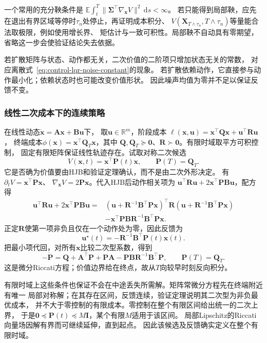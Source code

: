 一个常用的充分鞅条件是
$\mathbb E\int_t^T\lVert\bm\Sigma^\top\nabla_{\bm x}V\rVert^2\,\mathrm ds<\infty$。
若只能得到局部鞅，应先在退出有界区域等停时$\tau_n$处停止，再证明成本积分、
$V(\bm X_{T\wedge\tau_n},T\wedge\tau_n)$等量能合法取极限，例如使用增长界、
矩估计与一致可积性。局部鞅不自动具有零期望，省略这一步会使验证结论失去依据。

若扩散矩阵与状态、动作都无关，二次价值的二阶项只增加状态无关的常数，
对应离散式~\eqref{eq:control-lqr-noise-constant}的现象。
若扩散依赖动作，它直接参与动作最小化；依赖状态时也可能改变价值形状。
因此噪声均值为零并不足以保证反馈不变。

\subsubsection{线性二次成本下的连续策略}

在线性动态$\dot{\bm x}=\bm A\bm x+\bm B\bm u$下，
取$\bm u\in\mathbb R^m$，阶段成本
$\ell(\bm x,\bm u)=\bm x^\top\bm Q\bm x+\bm u^\top\bm R\bm u$，
终端成本$\phi(\bm x)=\bm x^\top\bm Q_T\bm x$，其中
$\bm Q,\bm Q_T\succeq\bm0$、$\bm R\succ\bm0$。有限时域取平方可积控制，
固定有限矩阵保证线性轨迹存在。试取对称二次候选
\[
  V(\bm x,t)=\bm x^\top\bm P(t)\bm x,\qquad \bm P(T)=\bm Q_T.
\]
它是否确为价值要由HJB和验证定理确认，而不是由二次外形决定。
有
$\partial_tV=\bm x^\top\dot{\bm P}\bm x$、
$\nabla_{\bm x}V=2\bm P\bm x$。代入HJB后动作相关项为
$\bm u^\top\bm R\bm u+2\bm x^\top\bm P\bm B\bm u$，配方得
\begin{align*}
  \bm u^\top\bm R\bm u+2\bm x^\top\bm P\bm B\bm u
  ={}&
  (\bm u+\bm R^{-1}\bm B^\top\bm P\bm x)^\top
    \bm R(\bm u+\bm R^{-1}\bm B^\top\bm P\bm x)\\
  &-\bm x^\top\bm P\bm B\bm R^{-1}\bm B^\top\bm P\bm x.
\end{align*}
正定$\bm R$使第一项非负且仅在一个动作处为零，因此反馈为
\begin{equation}
  \bm u^\star(t)=-\bm R^{-1}\bm B^\top\bm P(t)\bm x(t).
  \label{eq:control-continuous-lqr-gain}
\end{equation}
把最小项代回，对所有$\bm x$比较二次型系数，得到
\begin{equation}
  -\dot{\bm P}
  =\bm Q+\bm A^\top\bm P+\bm P\bm A
    -\bm P\bm B\bm R^{-1}\bm B^\top\bm P,\qquad
  \bm P(T)=\bm Q_T.
  \label{eq:control-continuous-riccati}
\end{equation}
这是微分Riccati方程；价值边界给在终点，故从$T$向较早时刻反向积分。

有限时域上这些条件也保证不会在中途丢失所需解。矩阵常微分方程先在终端附近有唯一
局部对称解；在其存在区间，反馈连续，验证定理说明其二次型为非负最优成本，
并不大于零控制的有限成本。零控制在整个有限区间给出统一的二次上界，
于是$\bm0\preceq\bm P(t)\preceq M\bm I$，某个有限$M$适用于该区间。
局部Lipschitz的Riccati向量场因解有界而可继续延伸，直到起点。
因此该候选及反馈确实定义在整个有限时域。

